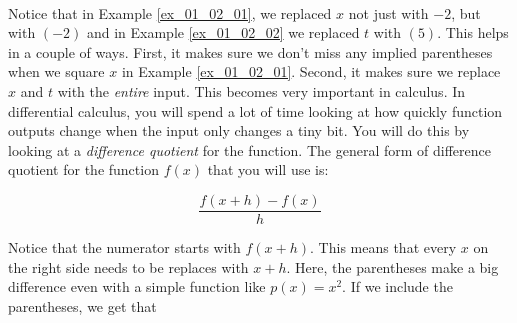 \\

Notice that in Example \ref{ex_01_02_01}, we replaced $x$ not just with $-2$, but with $(-2)$ and in Example \ref{ex_01_02_02} we replaced $t$ with $(5)$. This helps in a couple of ways. First, it makes sure we don't miss any implied parentheses when we square $x$ in Example \ref{ex_01_02_01}. Second, it makes sure we replace $x$ and $t$ with the \emph{entire} input. This becomes very important in calculus. In differential calculus, you will spend a lot of time looking at how quickly function outputs change when the input only changes a tiny bit. You will do this by looking at a \emph{difference quotient} for the function. The general form of difference quotient for the function $f(x)$ that you will use is:

\begin{equation}\label{eqn:difference_quotient}
	\frac{f(x+h) - f(x)}{h}
\end{equation}

Notice that the numerator starts with $f(x+h)$. This means that every $x$ on the right side needs to be replaces with $x+h$. Here, the parentheses make a big difference even with a simple function like $p(x)=x^2$. If we include the parentheses, we get that 

